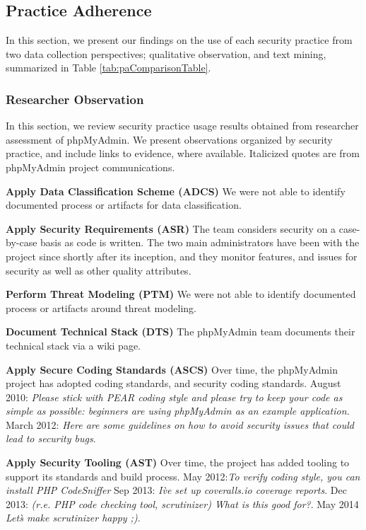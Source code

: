 \subsection{Practice Adherence}

In this section, we present our findings on the use of each security practice from two data collection perspectives; qualitative observation, and text mining, summarized in Table \ref{tab:paComparisonTable}.

\subsubsection{Researcher Observation}

In this section, we review security practice usage results obtained from researcher assessment of phpMyAdmin. We present observations organized by security practice, and include links to evidence, where available. Italicized quotes are from phpMyAdmin project communications.

\textbf{Apply Data Classification Scheme (ADCS)}
We were not able to identify documented process or artifacts for data classification.

\textbf{Apply Security Requirements (ASR)}
The team considers security on a case-by-case basis as code is written. The two main administrators have been with the project since shortly after its inception, and they monitor features, and issues for security as well as other quality attributes.

\textbf{Perform Threat Modeling (PTM)}
We were not able to identify documented process or artifacts around threat modeling. 

\textbf{Document Technical Stack (DTS)}
The phpMyAdmin team documents their technical stack via a wiki page.

\textbf{Apply Secure Coding Standards (ASCS)}
Over time, the phpMyAdmin project has adopted coding standards, and security coding standards. August 2010: \textit{Please stick with PEAR coding style and please try to keep your code as simple as possible: beginners are using phpMyAdmin as an example application.}  March 2012: \textit{Here are some guidelines on how to avoid security issues that could lead to security bugs}.

\textbf{Apply Security Tooling (AST)}
Over time, the project has added tooling to support its standards and build process. May 2012:\textit{To verify coding style, you can install PHP CodeSniffer}  Sep 2013: \textit{I\`ve set up coveralls.io coverage reports}. Dec 2013: \textit{(r.e. PHP code checking tool, scrutinizer) What is this good for?}. May 2014 \textit{Let\`s make scrutinizer happy ;)}. 

